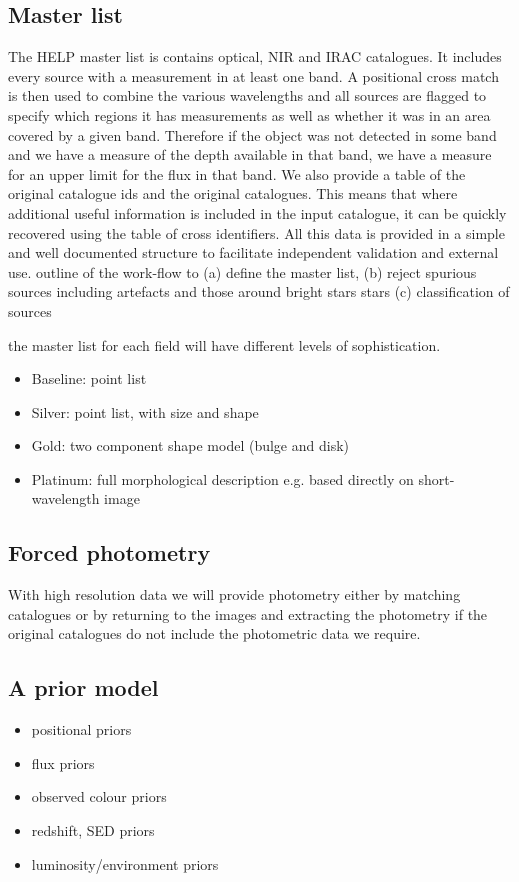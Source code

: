 \documentclass[usenatbib]{mnras}
\begin{document}
\subsection{Master list}
\label{sec:masterlist}
The HELP master list is contains optical, NIR and IRAC catalogues. It includes every 
source with a measurement in at least one band. A positional cross match is then
used to combine the various wavelengths and all sources are flagged to specify
which regions it has measurements as well as whether it was in an area covered by a
given band. Therefore if the object was not detected in some band and we have a measure 
of the depth available in that band, we have a measure for an upper limit for the flux in
that band. We also provide a table of the original catalogue ids and the original catalogues.
This means that where additional useful information is included in the input catalogue,
it can be quickly recovered using the table of cross identifiers. All this data is provided in a
simple and well documented structure to facilitate independent validation and external use.
{\color{red} outline of the work-flow to (a) define the master list, (b) reject
spurious sources including artefacts and those around bright stars stars (c)
classification of sources }

the master list for each field will have different levels of sophistication.

\begin{itemize}
  \item{Baseline: point list}
  \item{Silver: point list, with size and shape}
  \item{Gold: two component shape model (bulge and disk)}
  \item{Platinum: full morphological description e.g. based directly on
    short-wavelength image}
\end{itemize}

\subsection{Forced photometry}

With high resolution data we will provide photometry either by matching
catalogues or by returning to the images and extracting the photometry if the
original catalogues do not include the photometric data we require.

\subsection{A prior model}
\begin{itemize}
  \item{positional priors}
  \item{flux priors}
  \item{observed colour priors}
  \item{redshift, SED priors}
  \item{luminosity/environment priors}
\end {itemize}
\end{document}
